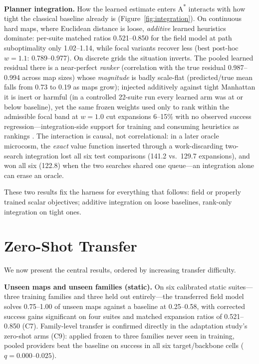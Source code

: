 \documentclass[letterpaper]{article} %
\newcommand{\stage}[1]{\textsc{#1}}
\begin{document}
\textbf{Planner integration.} How the learned estimate enters A\textsuperscript{*} interacts with how tight the classical baseline already is (Figure~\ref{fig:integration}). On continuous hard maps, where Euclidean distance is loose, \emph{additive} learned heuristics dominate: per-suite matched ratios 0.521--0.850 for the field model at path suboptimality only 1.02--1.14, while focal variants \citep{pearl1982semiadmissible,pohl1970} recover less (best post-hoc $w{=}1.1$: 0.789--0.977). On discrete grids the situation inverts. The pooled learned residual there is a near-perfect \emph{ranker} (correlation with the true residual 0.987--0.994 across map sizes) whose \emph{magnitude} is badly scale-flat (predicted/true mean falls from 0.73 to 0.19 as maps grow); injected additively against tight Manhattan it is inert or harmful (in a controlled 22-suite run every learned arm was at or below baseline), yet the same frozen weights used only to rank within the admissible focal band at $w{=}1.0$ cut expansions 6--15\% with no observed success regression---integration-side support for training and consuming heuristics as rankings \citep{chrestien2023rank}. The interaction is causal, not correlational: in a later oracle microcosm, the \emph{exact} value function inserted through a work-discarding two-search integration lost all six test comparisons (141.2 vs.\ 129.7 expansions), and won all six (122.8) when the two searches shared one queue---an integration alone can erase an oracle.

These two results fix the harness for everything that follows: field or properly trained scalar objectives; additive integration on loose baselines, rank-only integration on tight ones.

\section{Zero-Shot Transfer}

We now present the central results, ordered by increasing transfer difficulty.

\textbf{Unseen maps and unseen families (static).} On six calibrated static suites---three training families and three held out entirely---the transferred field model solves 0.75--1.00 of unseen maps against a baseline at 0.25--0.58, with corrected success gains significant on four suites and matched expansion ratios of 0.521--0.850 (\stage{C7}). Family-level transfer is confirmed directly in the adaptation study's zero-shot arms (\stage{C9}): applied frozen to three families never seen in training, pooled providers beat the baseline on success in all six target/backbone cells ($q{=}0.000$--$0.025$).
\end{document}
